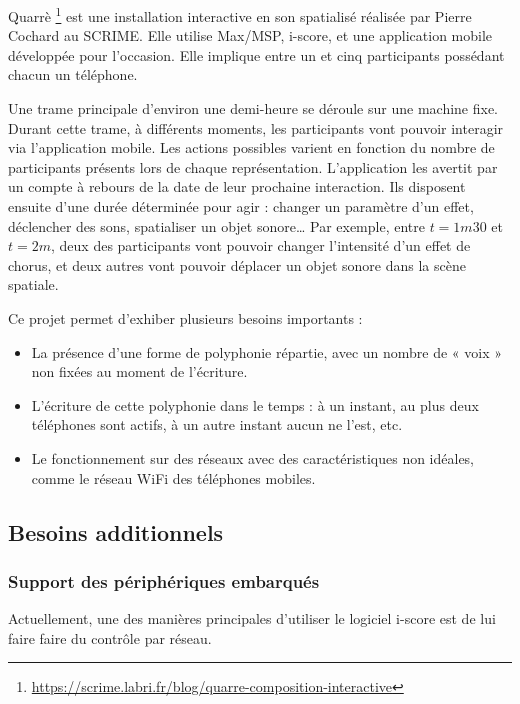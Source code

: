 \documentclass[10pt]{article}
\begin{document}
Quarrè
\footnote{\tiny\url{https://scrime.labri.fr/blog/quarre-composition-interactive}} est une installation interactive en son spatialisé réalisée par Pierre Cochard au SCRIME. 
Elle utilise Max/MSP, i-score, et une application mobile développée pour l'occasion. 
Elle implique entre un et cinq participants possédant chacun un téléphone.

Une trame principale d'environ une demi-heure se déroule sur une machine fixe.
Durant cette trame, à différents moments, les participants vont pouvoir interagir via l'application mobile. 
Les actions possibles varient en fonction du nombre de participants présents lors de chaque représentation.
L'application les avertit par un compte à rebours de la date de leur prochaine interaction. 
Ils disposent ensuite d'une durée déterminée pour agir : changer un paramètre d'un effet, déclencher des sons, spatialiser un objet sonore\dots{}
Par exemple, entre $t=1m30$ et $t=2m$, deux des participants vont pouvoir changer l'intensité d'un effet de chorus, et deux autres vont pouvoir déplacer un objet sonore dans la scène spatiale. 

Ce projet permet d'exhiber plusieurs besoins importants : 
\begin{itemize}
    \item La présence d'une forme de polyphonie répartie, avec un nombre de « voix » non fixées au moment de l'écriture.
    \item L'écriture de cette polyphonie dans le temps : à un instant, au plus deux téléphones sont actifs, à  un autre instant aucun ne l'est, etc.
    \item Le fonctionnement sur des réseaux avec des caractéristiques non idéales, comme le réseau WiFi des téléphones mobiles.
\end{itemize}

\subsection{Besoins additionnels}
\subsubsection{Support des périphériques embarqués}
Actuellement, une des manières principales d'utiliser le logiciel i-score est de lui faire faire du contrôle par réseau. 
\end{document}

